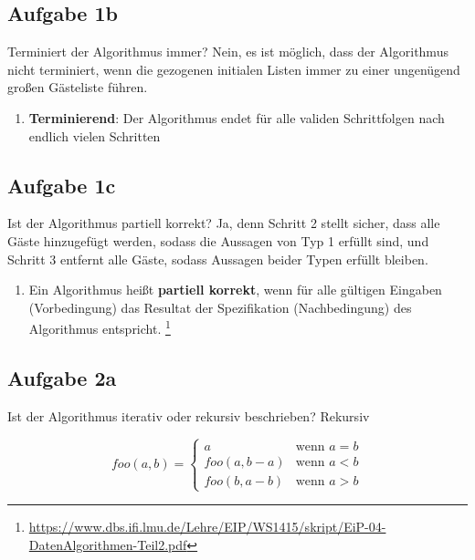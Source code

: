 \documentclass[
	aspectratio=169, 
	10pt 
]{beamer}
\begin{document}
\subsection{Aufgabe 1b}
\begin{frame}{\insertsubsection} 
	\begin{exercise}{Terminiert der Algorithmus immer?}
		Nein, es ist möglich, dass der Algorithmus nicht terminiert, wenn die gezogenen
		initialen Listen immer zu einer ungenügend großen Gästeliste führen.
	\end{exercise}

	\mbox{}

	\begin{enumerate}[$\rightarrow$]
		\item \textbf{Terminierend}: Der Algorithmus endet für alle validen Schrittfolgen nach endlich vielen Schritten
	\end{enumerate}
\end{frame}

\subsection{Aufgabe 1c}
\begin{frame}{\insertsubsection} 
	\begin{exercise}{Ist der Algorithmus partiell korrekt?}
		Ja, denn Schritt 2 stellt sicher, dass alle Gäste hinzugefügt werden, sodass die
		Aussagen von Typ 1 erfüllt sind, und Schritt 3 entfernt alle Gäste, sodass Aussagen
		beider Typen erfüllt bleiben.
	\end{exercise}

	\mbox{}

	\begin{enumerate}[$\rightarrow$]
		\item Ein Algorithmus heißt \textbf{partiell korrekt}, wenn für alle gültigen Eingaben (Vorbedingung) das Resultat der Spezifikation (Nachbedingung) des Algorithmus entspricht. \footnote[1]{\url{https://www.dbs.ifi.lmu.de/Lehre/EIP/WS1415/skript/EiP-04-DatenAlgorithmen-Teil2.pdf}}
	\end{enumerate}
\end{frame}


\subsection{Aufgabe 2a}
\begin{frame}{\insertsubsection} 
	\begin{exercise}{Ist der Algorithmus iterativ oder rekursiv beschrieben?}
		Rekursiv
	\end{exercise}

	\mbox{}

	$$
	foo(a,b) = \begin{cases}
		a 				& \text{wenn } a = b \\
		foo(a, b-a) 	& \text{wenn } a < b \\
		foo(b, a-b)		& \text{wenn } a > b
	\end{cases}
	$$

\end{frame}
\end{document}
